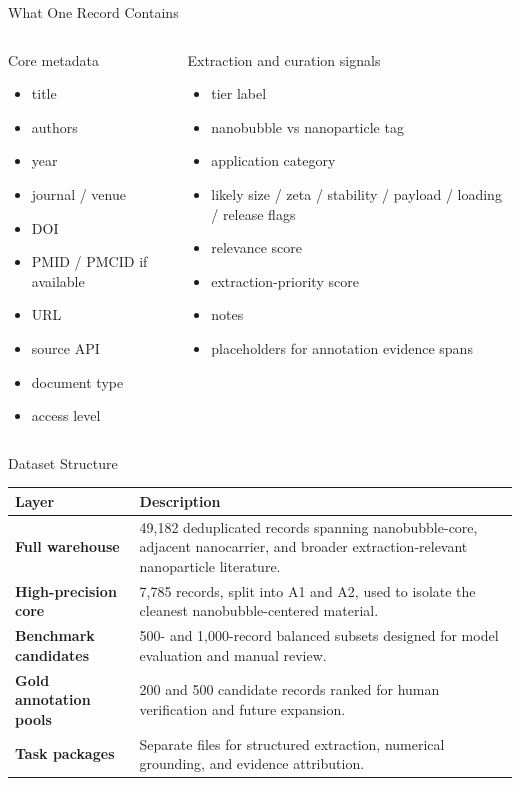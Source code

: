 \documentclass[aspectratio=169]{beamer}
\begin{document}
\begin{frame}{What One Record Contains}
\small
\begin{columns}[T,onlytextwidth]
\begin{block}{Core metadata}
\begin{itemize}
    \item title
    \item authors
    \item year
    \item journal / venue
    \item DOI
    \item PMID / PMCID if available
    \item URL
    \item source API
    \item document type
    \item access level
\end{itemize}
\end{block}

\begin{block}{Extraction and curation signals}
\begin{itemize}
    \item tier label
    \item nanobubble vs nanoparticle tag
    \item application category
    \item likely size / zeta / stability / payload / loading / release flags
    \item relevance score
    \item extraction-priority score
    \item notes
    \item placeholders for annotation evidence spans
\end{itemize}
\end{block}
\end{columns}
\end{frame}

\begin{frame}{Dataset Structure}
\begin{tabularx}{\textwidth}{>{\bfseries}p{3.4cm}X}
\toprule
Layer & Description \\
\midrule
Full warehouse & 49,182 deduplicated records spanning nanobubble-core, adjacent nanocarrier, and broader extraction-relevant nanoparticle literature. \\
High-precision core & 7,785 records, split into A1 and A2, used to isolate the cleanest nanobubble-centered material. \\
Benchmark candidates & 500- and 1,000-record balanced subsets designed for model evaluation and manual review. \\
Gold annotation pools & 200 and 500 candidate records ranked for human verification and future expansion. \\
Task packages & Separate files for structured extraction, numerical grounding, and evidence attribution. \\
\bottomrule
\end{tabularx}
\end{frame}
\end{document}
